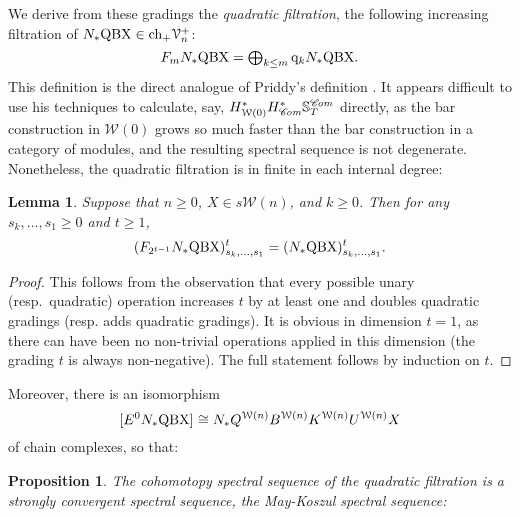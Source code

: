 \documentclass[11pt]{amsart} \renewcommand{\baselinestretch}{1.2}
\theoremstyle{plain}
\newtheorem{lem}[thm]{Lemma}
\newtheorem{prop}[thm]{Proposition}
\numberwithin{equation}{section} %
\theoremstyle{plain}
\newtheorem{lem}[thm]{Lemma}
\newtheorem{prop}[thm]{Proposition}
\numberwithin{equation}{chapter} %
\newcommand{\scrC}{\mathscr{C}}
\newcommand{\calV}{\mathcal{V}}
\newcommand{\calw}{\mathcal{W}}
\newcommand{\vect}[2]{\calV^{#1}_{#2}}
\newcommand{\quadgrad}[1]{\mathrm{q}_{#1}}
\newcommand{\complexes}{\mathrm{ch}_+}
\newcommand{\algs}{{\scrC\!\textit{\normalfont\textit{om}}}}
\newcommand{\E}[5]{[E^{#1}_{#2}#3]^{#4}_{#5}}
\begin{document}
\begin{May sseq and vanishing line}
We derive from these gradings the \emph{quadratic filtration}, the following increasing filtration of $N_*\textup{QBX}\in \complexes \vect{+}{n}$:
\[F_mN_*\textup{QBX}=\textstyle\bigoplus_{k\leq m} \quadgrad{k}N_*\textup{QBX}. \]
This definition is the direct analogue of Priddy's definition \cite{PriddyKoszul.pdf}. It appears difficult to use his techniques to calculate, say, $H^*_{\calw(0)}H^*_\algs\mathbb{S}^{\algs}_T$ directly, as the bar construction in $\calw(0)$ grows so much faster than the bar construction in a category of modules, and the resulting spectral sequence is not degenerate. Nonetheless, the quadratic filtration is in finite in each internal degree:
\begin{lem}
Suppose that $n\geq0$, $X\in s\calw(n)$, and $k\geq0$. Then for any $s_k,\ldots,s_1\geq0$ and $t\geq1$,
\[(F_{2^{t-1}}N_*\textup{QBX})_{{s_k,\ldots,s_1}}^t=(N_*\textup{QBX})_{{s_k,\ldots,s_1}}^t.\]
\end{lem}
\begin{proof}
This follows from the observation that every possible unary (resp.\ quadratic) operation increases $t$ by at least one and doubles quadratic gradings (resp. adds quadratic gradings). It is obvious in dimension $t=1$, as there can have been no non-trivial operations applied in this dimension (the grading $t$ is always non-negative). The full statement follows by induction on $t$.
%
%
\end{proof}
Moreover, there is an isomorphism
\[\E{0}{}{N_*\textup{QBX}}{}{}\cong N_*Q^{\calw(n)}B^{\calw(n)}K^{\calw(n)}U^{\calw(n)}X\]
of chain complexes, so that:
\begin{prop}
\label{theMaySseq}
The cohomotopy spectral sequence of the quadratic filtration is a strongly convergent spectral sequence, the \emph{May-Koszul} spectral sequence:

\end{prop}
\end{May sseq and vanishing line}
\end{document}
